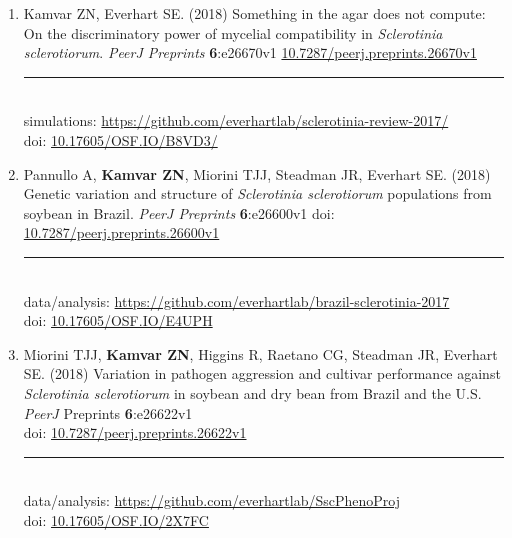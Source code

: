 \begin{enumerate}[leftmargin = 14pt]

	\item Kamvar ZN, Everhart SE. (2018) Something in the agar does not compute:
	On the discriminatory power of mycelial compatibility in \textit{Sclerotinia
	sclerotiorum}. \textit{PeerJ Preprints} \textbf{6}:e26670v1
	\href{https://doi.org/10.7287/peerj.preprints.26670v1}{10.7287/peerj.preprints.26670v1}\\
	\rule[0.25\baselineskip]{0.25\textwidth}{0.5pt}\\
	simulations:
	\href{https://github.com/everhartlab/sclerotinia-review-2017/#readme}{https://github.com/everhartlab/sclerotinia-review-2017/}\\
	doi:\phantom{ulations:} \href{https://doi.org/10.17605/OSF.IO/B8VD3/}{10.17605/OSF.IO/B8VD3/}

	\item Pannullo A, \textbf{Kamvar ZN}, Miorini TJJ, Steadman JR, Everhart SE.
	(2018) Genetic variation and structure of \textit{Sclerotinia sclerotiorum}
	populations from soybean in Brazil. \textit{PeerJ Preprints}
	\textbf{6}:e26600v1 doi:
	\href{https://doi.org/10.7287/peerj.preprints.26600v1}{10.7287/peerj.preprints.26600v1}\\
	\rule[0.25\baselineskip]{0.25\textwidth}{0.5pt}\\
	data/analysis:
	\href{https://github.com/everhartlab/brazil-sclerotinia-2017#readme}{https://github.com/everhartlab/brazil-sclerotinia-2017}\\
	doi:\phantom{t/analysis:} \href{https://doi.org/10.17605/OSF.IO/E4UPH}{10.17605/OSF.IO/E4UPH}

	\item Miorini TJJ, \textbf{Kamvar ZN}, Higgins R, Raetano CG, Steadman JR, Everhart SE. (2018) Variation in pathogen aggression and cultivar performance against \textit{Sclerotinia sclerotiorum} in soybean and dry bean from Brazil and the U.S. \textit{PeerJ} Preprints \textbf{6}:e26622v1\\
	doi: \href{https://doi.org/10.7287/peerj.preprints.26622v1}{10.7287/peerj.preprints.26622v1}\\
	\rule[0.25\baselineskip]{0.25\textwidth}{0.5pt}\\
	data/analysis:
	\href{https://github.com/everhartlab/SscPhenoProj#readme}{https://github.com/everhartlab/SscPhenoProj}\\
	doi:\phantom{t/analysis:} \href{https://doi.org/10.17605/OSF.IO/2X7FC}{10.17605/OSF.IO/2X7FC}

\end{enumerate}


